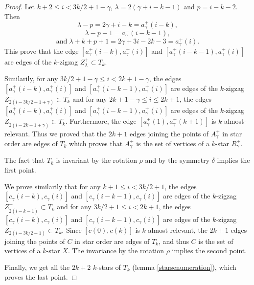 \documentclass[12pt]{amsart}
\begin{document}
\begin{proof}
Let $k+2\le i< 3k/2+1-\gamma$, $\lambda=2(\gamma+i-k-1)$ and $p=i-k-2$. Then
$$\lambda-p=2\gamma+i-k=a^+_{\gamma}(i-k),$$
$$\lambda-p-1=a^+_{\gamma}(i-k-1),$$
$$\mathrm{and}\; \lambda+k+p+1=2\gamma+3i-2k-3=a^+_\gamma(i).$$
This prove that the edge $[a^+_{\gamma}(i-k),a^+_\gamma(i)]$ and $[a^+_\gamma(i-k-1),a^+_{\gamma}(i)]$ are edges of the $k$-zigzag $Z^+_{\lambda}\subset T_k$.

Similarily, for any $3k/2+1-\gamma\le i< 2k+1-\gamma$, the edges $[a^+_{\gamma}(i-k),a^+_\gamma(i)]$ and $[a^+_{\gamma}(i-k-1),a^+_\gamma(i)]$ are edges of the $k$-zigzag $Z^-_{2(i-3k/2-1+\gamma)}\subset T_k$ and for any $2k+1-\gamma\le i\le 2k+1$, the edges $[a^+_{\gamma}(i-k),a^+_\gamma(i)]$ and $[a^+_{\gamma}(i-k-1),a^+_\gamma(i)]$ are edges of the $k$-zigzag $Z^+_{2(i-2k-1+\gamma)}\subset T_k$. Furthermore, the edge $[a^+_\gamma(1),a^+_{\gamma}(k+1)]$ is $k$-almost-relevant. Thus we proved that the $2k+1$ edges joining the points of $A^+_{\gamma}$ in star order are edges of $T_k$ which proves that $A^+_{\gamma}$ is the set of vertices of a $k$-star $R^+_{\gamma}$.

The fact that $T_k$ is invariant by the rotation $\rho$ and by the symmetry $\delta$ implies the first point.

\bigskip
We prove similarily that for any $k+1\le i< 3k/2+1$, the edges $[c_{\gamma}(i-k),c_\gamma(i)]$ and $[c_\gamma(i-k-1),c_{\gamma}(i)]$ are edges of the $k$-zigzag $Z^+_{2(i-k-1)}\subset T_k$ and for any $3k/2+1\le i< 2k+1$, the edges $[c_\gamma(i-k),c_{\gamma}(i)]$ and $[c_\gamma(i-k-1),c_{\gamma}(i)]$ are edges of the $k$-zigzag $Z^-_{2(i-3k/2-1)}\subset T_k$. Since $[c(0),c(k)]$ is $k$-almost-relevant, the $2k+1$ edges joining the points of $C$ in star order are edges of $T_k$, and thus $C$ is the set of vertices of a $k$-star $X$. The invariance by the rotation $\rho$ implies the second point.

\bigskip
Finally, we get all the $2k+2$ $k$-stars of $T_k$ (lemma \ref{starsenumeration}), which proves the last point.
\end{proof}
\end{document}

